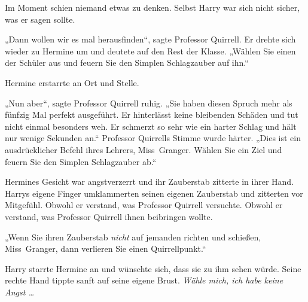 Im Moment schien niemand etwas zu denken. Selbst Harry war sich nicht sicher, was er sagen sollte.

„Dann wollen wir es mal herausfinden“, sagte Professor Quirrell. Er drehte sich wieder zu Hermine um und deutete auf den Rest der Klasse. „Wählen Sie einen der Schüler aus und feuern Sie den Simplen Schlagzauber auf ihn.“

Hermine erstarrte an Ort und Stelle.

„Nun aber“, sagte Professor Quirrell ruhig. „Sie haben diesen Spruch mehr als fünfzig Mal perfekt ausgeführt. Er hinterlässt keine bleibenden Schäden und tut nicht einmal besonders weh. Er schmerzt so sehr wie ein harter Schlag und hält nur wenige Sekunden an.“ Professor Quirrells Stimme wurde härter. „Dies ist ein ausdrücklicher Befehl ihres Lehrers, Miss~Granger. Wählen Sie ein Ziel und feuern Sie den Simplen Schlagzauber ab.“

Hermines Gesicht war angstverzerrt und ihr Zauberstab zitterte in ihrer Hand. Harrys eigene Finger umklammerten seinen eigenen Zauberstab und zitterten vor Mitgefühl. Obwohl er verstand, was Professor Quirrell versuchte. Obwohl er verstand, was Professor Quirrell ihnen beibringen wollte.

„Wenn Sie ihren Zauberstab \emph{nicht} auf jemanden richten und schießen, Miss~Granger, dann verlieren Sie einen Quirrellpunkt.“

Harry starrte Hermine an und wünschte sich, dass sie zu ihm sehen würde. Seine rechte Hand tippte sanft auf seine eigene Brust. \emph{Wähle mich, ich habe keine Angst …}

